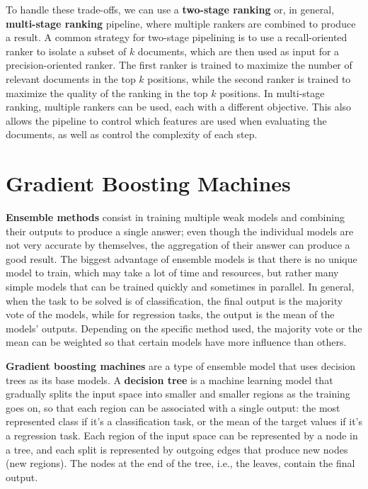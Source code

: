To handle these trade-offs, we can use a \textbf{two-stage ranking} or, in general, \textbf{multi-stage ranking} pipeline, where multiple rankers are combined to produce a result. A common strategy for two-stage pipelining is to use a recall-oriented ranker to isolate a subset of $k$ documents, which are then used as input for a precision-oriented ranker. The first ranker is trained to maximize the number of relevant documents in the top $k$ positions, while the second ranker is trained to maximize the quality of the ranking in the top $k$ positions. In multi-stage ranking, multiple rankers can be used, each with a different objective. This also allows the pipeline to control which features are used when evaluating the documents, as well as control the complexity of each step.

\section{Gradient Boosting Machines}

\textbf{Ensemble methods} consist in training multiple weak models and combining their outputs to produce a single answer; even though the individual models are not very accurate by themselves, the aggregation of their answer can produce a good result. The biggest advantage of ensemble models is that there is no unique model to train, which may take a lot of time and resources, but rather many simple models that can be trained quickly and sometimes in parallel. In general, when the task to be solved is of classification, the final output is the majority vote of the models, while for regression tasks, the output is the mean of the models' outputs. Depending on the specific method used, the majority vote or the mean can be weighted so that certain models have more influence than others.

\textbf{Gradient boosting machines} are a type of ensemble model that uses decision trees as its base models. A \textbf{decision tree} is a machine learning model that gradually splits the input space into smaller and smaller regions as the training goes on, so that each region can be associated with a single output: the most represented class if it's a classification task, or the mean of the target values if it's a regression task. Each region of the input space can be represented by a node in a tree, and each split is represented by outgoing edges that produce new nodes (new regions). The nodes at the end of the tree, i.e., the leaves, contain the final output.

